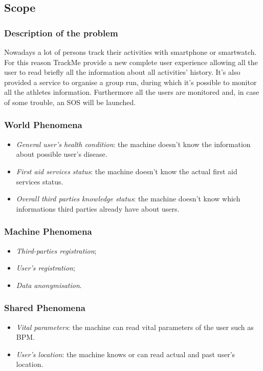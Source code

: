 \documentclass{article}
\begin{document}
\subsection{Scope}
\subsubsection{Description of the problem}
Nowadays a lot of persons track their activities with smartphone or
smartwatch. For this reason TrackMe provide a new complete user 
experience allowing all the user to read briefly all the information
about all activities’ history.
It’s also provided a service to organise a group run, during which
it’s possible to monitor all the athletes information.
Furthermore all the users are monitored and, in case of some trouble, 
an SOS will be launched.
\newpage
\subsubsection{World Phenomena}
\begin{itemize}
	\item \textit{General user’s health condition}: the machine doesn’t know the information about possible user’s disease.
	\item \textit{First aid services status}: the machine doesn’t know the actual first aid services status.
	\item \textit{Overall third parties knowledge status}: the machine doesn’t know which informations third parties already have about users.
\end{itemize}

\subsubsection{Machine Phenomena}
\begin{itemize}
	\item \textit{Third-parties registration};
	\item \textit{User's registration};
	\item \textit{Data anonymisation}.
\end{itemize}

\subsubsection{Shared Phenomena}
\begin{itemize}
	\item \textit{Vital parameters}: the machine can read vital parameters of the user such as BPM.
	\item \textit{User's location}: the machine knows or can read actual and past user’s location.
\end{itemize}
\end{document}
